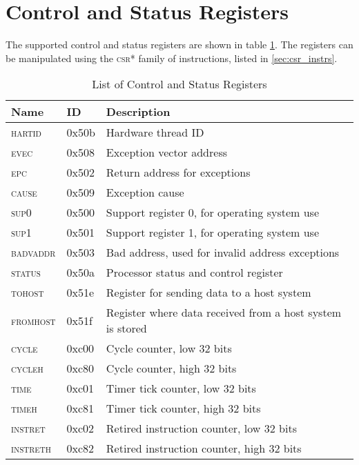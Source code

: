\documentclass[12pt,a4paper]{report}
\newcommand{\register}[1]{\textsc{#1}}
\begin{document}
\section{Control and Status Registers}

The supported control and status registers are shown in table \ref{tab:csr_list}. The registers
can be manipulated using the \textsc{csr*} family of instructions, listed in \ref{sec:csr_instrs}.

\begin{table}
	\centering
	\begin{tabular}{|l|l|l|}
		\hline
		\textbf{Name}		& \textbf{ID}	& \textbf{Description} \\
		\hline
		\register{hartid}	& 0x50b		& Hardware thread ID \\
		\register{evec}		& 0x508		& Exception vector address \\
		\register{epc}		& 0x502		& Return address for exceptions \\
		\register{cause}	& 0x509		& Exception cause \\
		\register{sup0}		& 0x500		& Support register 0, for operating system use \\
		\register{sup1}		& 0x501		& Support register 1, for operating system use \\
		\register{badvaddr}	& 0x503		& Bad address, used for invalid address exceptions \\
		\register{status}	& 0x50a		& Processor status and control register \\
		\register{tohost}	& 0x51e		& Register for sending data to a host system \\
		\register{fromhost}	& 0x51f		& Register where data received from a host system is stored \\
		\register{cycle}	& 0xc00		& Cycle counter, low 32 bits \\
		\register{cycleh}	& 0xc80		& Cycle counter, high 32 bits \\
		\register{time}		& 0xc01		& Timer tick counter, low 32 bits \\
		\register{timeh}	& 0xc81		& Timer tick counter, high 32 bits \\
		\register{instret}	& 0xc02		& Retired instruction counter, low 32 bits \\
		\register{instreth}	& 0xc82		& Retired instruction counter, high 32 bits \\
		\hline
	\end{tabular}
	\caption{List of Control and Status Registers}
	\label{tab:csr_list}
\end{table}
\FloatBarrier
\end{document}
